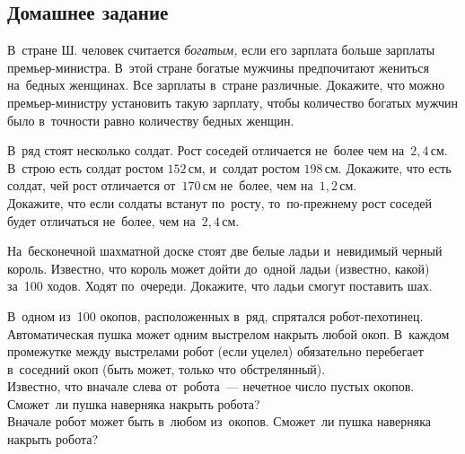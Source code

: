 

\subsection*{Домашнее задание}



\begin{problems}


\item
В~стране Ш. человек считается \emph{богатым,} если его зарплата больше
зарплаты премьер-министра.
В~этой стране богатые мужчины предпочитают жениться на~бедных женщинах.
Все зарплаты в~стране различные.
Докажите, что можно премьер-министру установить такую зарплату, чтобы
количество богатых мужчин было в~точности равно количеству бедных женщин.

\item
В~ряд стоят несколько солдат.
Рост соседей отличается не~более чем на~$2{,}4\,\text{см}$.
\\
\subproblem
В~строю есть солдат ростом $152\,\text{см}$, и~солдат ростом $198\,\text{см}$.
Докажите, что есть солдат, чей рост отличается от~$170\,\text{см}$ не~более, чем
на~$1{,}2\,\text{см}$.
\\
\subproblem
Докажите, что если солдаты встанут по~росту, то~по-прежнему рост соседей будет
отличаться не~более, чем на~$2{,}4\,\text{см}$.

\item
На~бесконечной шахматной доске стоят две белые ладьи и~невидимый черный король.
Известно, что король может дойти до~одной ладьи (известно, какой) за~100 ходов.
Ходят по~очереди.
Докажите, что ладьи смогут поставить шах.

\item
В~одном из~100 окопов, расположенных в~ряд, спрятался робот-пехотинец.
Автоматическая пушка может одним выстрелом накрыть любой окоп.
В~каждом промежутке между выстрелами робот (если уцелел) обязательно перебегает
в~соседний окоп (быть может, только что обстрелянный).
\\
\subproblem
Известно, что вначале слева от~робота~— нечетное число пустых окопов.
Сможет~ли пушка наверняка накрыть робота?
\\
\subproblem
Вначале робот может быть в~любом из~окопов.
Сможет~ли пушка наверняка накрыть робота?

\end{problems}

